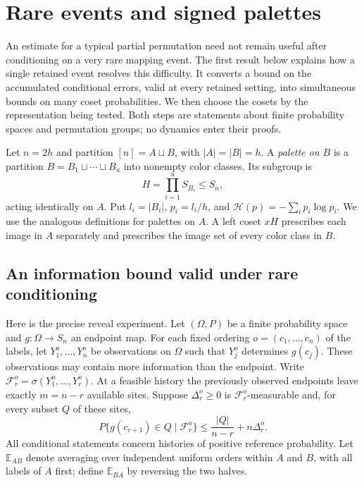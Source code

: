 \section{Rare events and signed palettes}
\label{l:palettes}

An estimate for a typical partial permutation need not remain useful after
conditioning on a very rare mapping event.  The first result below explains
how a single retained event resolves this difficulty.  It converts a bound
on the accumulated conditional errors, valid at every retained setting,
into simultaneous bounds on many coset probabilities.  We then choose the
cosets by the representation being tested.  Both steps are statements about
finite probability spaces and permutation groups; no dynamics enter their
proofs.

Let $n=2h$ and partition $[n]=A\sqcup B$, with $|A|=|B|=h$.
A \emph{palette on $B$} is a partition $B=B_1\sqcup\cdots\sqcup B_u$
into nonempty color classes.  Its subgroup is
\[
 H=\prod_{i=1}^u S_{B_i}\le S_n,
\]
acting identically on $A$.  Put $l_i=|B_i|$, $p_i=l_i/h$, and
$\mathcal H(p)=-\sum_i p_i\log p_i$.  We use the analogous definitions
for palettes on $A$.  A left coset $xH$ prescribes each image in $A$
separately and prescribes the image set of every color class in $B$.

\subsection{An information bound valid under rare conditioning}

Here is the precise reveal experiment.  Let $(\Omega,P)$ be a finite
probability space and $g:\Omega\to S_n$ an endpoint map.  For each fixed
ordering $o=(c_1,\ldots,c_n)$ of the labels, let
$Y_1^o,\ldots,Y_n^o$ be observations on $\Omega$ such that $Y_j^o$
determines $g(c_j)$.  These observations may contain more information
than the endpoint.  Write $\mathcal F_r^o=\sigma(Y_1^o,\ldots,Y_r^o)$.
At a feasible history the previously observed endpoints leave exactly
$m=n-r$ available sites.  Suppose $\Delta_r^o\ge0$ is
$\mathcal F_r^o$-measurable and, for every subset $Q$ of these sites,
\begin{equation}
 P\{g(c_{r+1})\in Q\mid\mathcal F_r^o\}
 \le \frac{|Q|}{n-r}+n\Delta_r^o.
 \label{l:palette-reference-cap}
\end{equation}
All conditional statements concern histories of positive reference
probability.  Let $\mathbb E_{AB}$ denote averaging over independent
uniform orders within $A$ and $B$, with all labels of $A$ first;
define $\mathbb E_{BA}$ by reversing the two halves.

